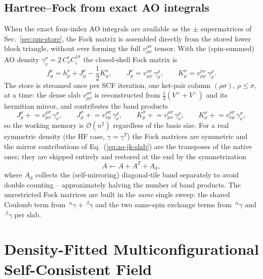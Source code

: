\documentclass[a4paper,12pt,oneside]{book}
\newcommand{\half}{\frac{1}{2}}
\newcommand{\eq}[1]{Eq.~(\ref{#1})}
\newcommand{\pre}[1]{\,#1\!}
\begin{document}
\section{Hartree--Fock from exact AO integrals} \label{sec:ao-hf}
When the exact four-index AO integrals are available as the $\pm$ supermatrices of
Sec.~\ref{sec:pm-store}, the Fock matrix is assembled directly from the stored lower block
triangle, without ever forming the full $v_{\mu\nu}^{\rho\sigma}$ tensor. With the (spin-summed)
AO density $\gamma_{\nu}^{\sigma} = 2\,C_{\nu}^{i} C^{\dagger\sigma}_{i}$ the closed-shell Fock
matrix is
\begin{equation}
f_\mu^\nu = h_\mu^\nu + J_\mu^\nu - \half K_\mu^\nu,
\qquad
J_\mu^\nu = v_{\mu\rho}^{\nu\sigma}\, \gamma_{\sigma}^{\rho},
\qquad
K_\mu^\nu = v_{\mu\rho}^{\sigma\nu}\, \gamma_{\sigma}^{\rho}.
\end{equation}
The store is streamed once per SCF iteration, one ket-pair column $(\rho\sigma)$, $\rho\le\sigma$,
at a time: the dense slab $v_{\mu\nu}^{\rho\sigma}$ is reconstructed from
$\half(V^{+}+V^{-})$ and its hermitian mirror, and contributes the band products
\begin{equation}
\label{eq:ao-jk-slab}
J_\mu^{\rho} \mathrel{+}= v_{\mu\nu}^{\rho\sigma}\,\gamma_{\nu}^{\sigma},\qquad
J_\mu^{\sigma} \mathrel{+}= v_{\nu\mu}^{\rho\sigma}\,\gamma_{\nu}^{\rho},\qquad
K_\mu^{\sigma} \mathrel{+}= v_{\mu\nu}^{\rho\sigma}\,\gamma_{\nu}^{\rho},\qquad
K_\mu^{\rho} \mathrel{+}= v_{\nu\mu}^{\rho\sigma}\,\gamma_{\nu}^{\sigma},
\end{equation}
so the working memory is $\mathcal{O}(n^2)$ regardless of the basis size. For a real symmetric
density (the HF case, $\gamma = \gamma^{T}$) the Fock matrices are symmetric and the mirror
contributions of \eq{eq:ao-jk-slab} are the transposes of the native ones; they are skipped
entirely and restored at the end by the symmetrization
\begin{equation}
A \leftarrow A + A^{T} + A_{\mathrm d},
\end{equation}
where $A_{\mathrm d}$ collects the (self-mirroring) diagonal-tile band separately to avoid double
counting -- approximately halving the number of band products. The unrestricted Fock matrices are
built in the \emph{same} single sweep: the shared Coulomb term from
$\pre{^\alpha}\gamma + \pre{^\beta}\gamma$ and the two same-spin exchange terms from
$\pre{^\alpha}\gamma$ and $\pre{^\beta}\gamma$ per slab.

\chapter{Density-Fitted Multiconfigurational Self-Consistent Field}
\end{document}
